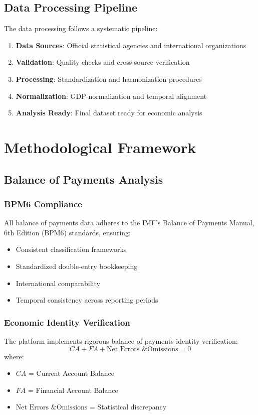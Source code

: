 \documentclass[11pt,a4paper]{article}
\begin{document}
\subsection{Data Processing Pipeline}
The data processing follows a systematic pipeline:

\begin{enumerate}
    \item \textbf{Data Sources}: Official statistical agencies and international organizations
    \item \textbf{Validation}: Quality checks and cross-source verification
    \item \textbf{Processing}: Standardization and harmonization procedures
    \item \textbf{Normalization}: GDP-normalization and temporal alignment
    \item \textbf{Analysis Ready}: Final dataset ready for economic analysis
\end{enumerate}

\section{Methodological Framework}

\subsection{Balance of Payments Analysis}

\subsubsection{BPM6 Compliance}
All balance of payments data adheres to the IMF's Balance of Payments Manual, 6th Edition (BPM6) standards, ensuring:
\begin{itemize}
    \item Consistent classification frameworks
    \item Standardized double-entry bookkeeping
    \item International comparability
    \item Temporal consistency across reporting periods
\end{itemize}

\subsubsection{Economic Identity Verification}
The platform implements rigorous balance of payments identity verification:
\begin{equation}
CA + FA + \text{Net Errors \& Omissions} = 0
\end{equation}
where:
\begin{itemize}
    \item $CA$ = Current Account Balance
    \item $FA$ = Financial Account Balance
    \item $\text{Net Errors \& Omissions}$ = Statistical discrepancy
\end{itemize}
\end{document}
